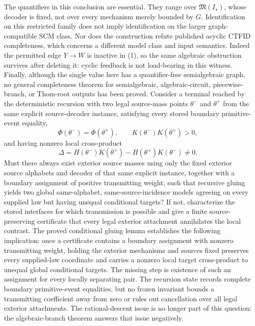 The quantifiers in this conclusion are essential.  They range over \(\mathfrak M(I_\star)\), whose decoder is fixed, not over every mechanism merely bounded by \(G\).  Identification on this restricted family does not imply identification on the larger graph-compatible SCM class.  Nor does the construction refute published acyclic CTFID completeness, which concerns a different model class and input semantics.  Indeed the permitted edge \(Y\to W\) is inactive in (1), so the same algebraic obstruction survives after deleting it: cyclic feedback is not load-bearing in this witness.  Finally, although the single value here has a quantifier-free semialgebraic graph, no general completeness theorem for semialgebraic, algebraic-circuit, piecewise-branch, or Thom-root outputs has been proved.
Consider a terminal reached by the deterministic recursion with two legal source-mass points \(\theta^-\) and \(\theta^+\) from the same explicit source-decoder instance, satisfying every stored boundary primitive-event equality,
\[
 \Phi(\theta^-)=\Phi(\theta^+),\qquad
 K(\theta^-)K(\theta^+)>0,
\]
and having nonzero local cross-product
\[
 \Delta=H(\theta^-)K(\theta^+)-H(\theta^+)K(\theta^-)\ne0.
\]
Must there always exist exterior source masses using only the fixed exterior source alphabets and decoder of that same explicit instance, together with a boundary assignment of positive transmitting weight, such that recursive gluing yields two global same-alphabet, same-source-incidence models agreeing on every supplied law but having unequal conditional targets?  If not, characterize the stored interfaces for which transmission is possible and give a finite source-preserving certificate that every legal exterior attachment annihilates the local contrast.
The proved conditional gluing lemma establishes the following implication: once a certificate contains a boundary assignment with nonzero transmitting weight, holding the exterior mechanisms and sources fixed preserves every supplied-law coordinate and carries a nonzero local target cross-product to unequal global conditional targets.  The missing step is existence of such an assignment for every locally separating pair.  The recursion state records complete boundary primitive-event equalities, but no frozen invariant bounds a transmitting coefficient away from zero or rules out cancellation over all legal exterior attachments.  The rational-descent issue is no longer part of this question: the algebraic-branch theorem answers that issue negatively.
